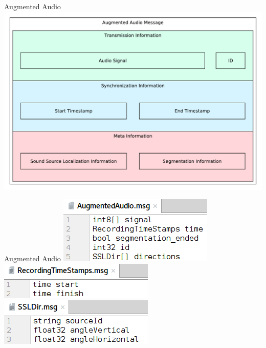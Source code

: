 \documentclass{beamer}
\begin{document}
	\begin{frame}{Augmented Audio}
		\centering
		\includegraphics[width=\textwidth]{Bilder/augmented_audio}
	\end{frame}
	
	\begin{frame}{Augmented Audio}
		\centering
		\includegraphics[width=.5\textwidth]{Bilder/rosmsg/augmented_audio.png}\\
		\vspace{.5cm}
		\includegraphics[width=.5\textwidth]{Bilder/rosmsg/timestamps.png}\\
		\vspace{.5cm}
		\includegraphics[width=.5\textwidth]{Bilder/rosmsg/SSLDir.png}
	\end{frame}
	
\end{document}
